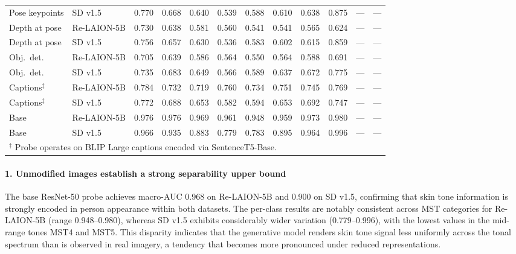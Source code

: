 \begin{table}[htbp]
\begin{tabular}{llcccccccccc}
		Pose keypoints        & SD v1.5     & 0.770 & 0.668 & 0.640 & 0.539 & 0.588 & 0.610 & 0.638 & 0.875 & --- & --- \\
		Depth at pose         & Re-LAION-5B & 0.730 & 0.638 & 0.581 & 0.560 & 0.541 & 0.541 & 0.565 & 0.624 & --- & --- \\
		Depth at pose         & SD v1.5     & 0.756 & 0.657 & 0.630 & 0.536 & 0.583 & 0.602 & 0.615 & 0.859 & --- & --- \\
		Obj.\ det.            & Re-LAION-5B & 0.705 & 0.639 & 0.586 & 0.564 & 0.550 & 0.564 & 0.588 & 0.691 & --- & --- \\
		Obj.\ det.            & SD v1.5     & 0.735 & 0.683 & 0.649 & 0.566 & 0.589 & 0.637 & 0.672 & 0.775 & --- & --- \\
		Captions$^\ddagger$   & Re-LAION-5B & 0.784 & 0.732 & 0.719 & 0.760 & 0.734 & 0.751 & 0.745 & 0.769 & --- & --- \\
		Captions$^\ddagger$   & SD v1.5     & 0.772 & 0.688 & 0.653 & 0.582 & 0.594 & 0.653 & 0.692 & 0.747 & --- & --- \\
		Base                  & Re-LAION-5B & 0.976 & 0.976 & 0.969 & 0.961 & 0.948 & 0.959 & 0.973 & 0.980 & --- & --- \\
		Base                  & SD v1.5     & 0.966 & 0.935 & 0.883 & 0.779 & 0.783 & 0.895 & 0.964 & 0.996 & --- & --- \\
		\bottomrule
		\multicolumn{12}{l}{\footnotesize $^\ddagger$ Probe operates on BLIP Large captions encoded via SentenceT5-Base.} \\
	\end{tabular}
\end{table}

\paragraph{1. Unmodified images establish a strong separability upper bound}

The base ResNet-50 probe achieves macro-AUC 0.968 on Re-LAION-5B and 0.900 on SD v1.5,
confirming that skin tone information is strongly encoded in person appearance within both
datasets. The per-class results are notably consistent across MST categories for
Re-LAION-5B (range 0.948--0.980), whereas SD v1.5 exhibits considerably wider variation
(0.779--0.996), with the lowest values in the mid-range tones MST4 and MST5. This
disparity indicates that the generative model renders skin tone signal less uniformly
across the tonal spectrum than is observed in real imagery, a tendency that becomes more
pronounced under reduced representations.

